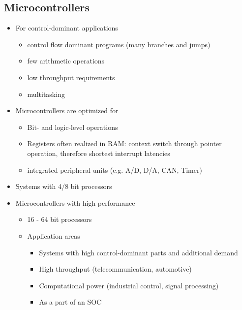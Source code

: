 \subsection{Microcontrollers}
\begin{itemize}
	\item For control-dominant applications
		\begin{itemize}
			\item control flow dominant programs (many branches and jumps)
			\item few arithmetic operations
			\item low throughput requirements
			\item multitasking
		\end{itemize} 
	\item Microcontrollers are optimized for
		\begin{itemize}
			\item Bit- and logic-level operations
			\item Registers often realized in RAM: context switch through pointer operation, therefore shortest interrupt latencies
			\item integrated peripheral units (e.g. A/D, D/A, CAN, Timer)
		\end{itemize}
	\item Systems with 4/8 bit processors
	\item Microcontrollers with high performance
		\begin{itemize}
			\item 16 - 64 bit processors
			\item Application areas
				\begin{itemize}
					\item Systems with high control-dominant parts and additional demand
					\item High throughput (telecommunication, automotive)
					\item Computational power (industrial control, signal processing)
					\item As a part of an SOC
				\end{itemize}	
		\end{itemize}
\end{itemize}

